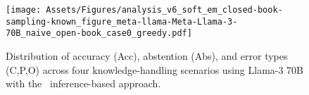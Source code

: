 \begin{figure}[t]
    \centering
    \texttt{[image: Assets/Figures/analysis\_v6\_soft\_em\_closed-book-sampling-known\_figure\_meta-llama-Meta-Llama-3-70B\_naive\_open-book\_case0\_greedy.pdf]} 
    \caption{Distribution of accuracy (Acc), abstention (Abs), and error types (C,P,O) across four knowledge-handling scenarios using Llama-3 70B with the \naive\ inference-based approach.}
    \label{figure:eval_v6_models_naive}
\end{figure}
